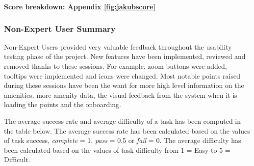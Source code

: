 \textbf{Score breakdown: Appendix \ref{fig:jakubscore}}

\subsubsection{Non-Expert User Summary}
Non-Expert Users provided very valuable feedback throughout the usability testing
phase of the project. New features have been implemented, reviewed and removed
thanks to these sessions.
For example, zoom buttons were added, tooltips were implemented and icons were
changed. Most notable points raised during these sessions have been the want for
more high level information on the amenities, more amenity data, the visual
feedback from the system when it is loading the points and the onboarding.

The average success rate and average difficulty of a task has been computed in
the table below. The average success rate has been calculated based on the
values of task success, \emph{complete} = 1, \emph{pass} = 0.5 or \emph{fail} =
0. The average difficulty has been calculated based on the values of task
difficulty from 1 = Easy to 5 = Difficult.

